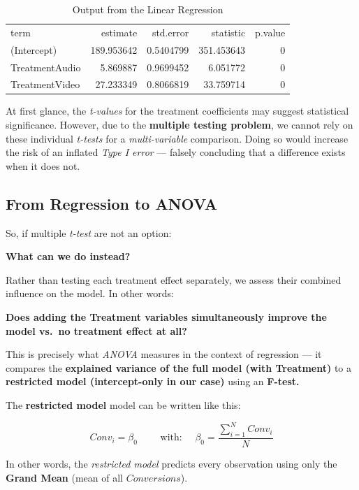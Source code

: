 \documentclass[
  letterpaper,
  DIV=11,
  numbers=noendperiod]{scrartcl}
\begin{document}
\begin{longtable}[t]{lrrrr}

\caption{\label{tbl-LM}Output from the Linear Regression}

\tabularnewline

\\
\toprule
term & estimate & std.error & statistic & p.value\\
\midrule
(Intercept) & 189.953642 & 0.5404799 & 351.453643 & 0\\
TreatmentAudio & 5.869887 & 0.9699452 & 6.051772 & 0\\
TreatmentVideo & 27.233349 & 0.8066819 & 33.759714 & 0\\
\bottomrule

\end{longtable}

At first glance, the \emph{t-values} for the treatment coefficients may
suggest statistical significance. However, due to the \textbf{multiple
testing problem}, we cannot rely on these individual \emph{t-tests} for
a \emph{multi-variable} comparison. Doing so would increase the risk of
an inflated \emph{Type I error} --- falsely concluding that a difference
exists when it does not.

\subsection{From Regression to ANOVA}\label{from-regression-to-anova}

So, if multiple \emph{t-test} are not an option:

\textbf{What can we do instead?}

Rather than testing each treatment effect separately, we assess their
combined influence on the model. In other words:

\textbf{Does adding the Treatment variables simultaneously improve the
model vs.~no treatment effect at all?}

This is precisely what \emph{ANOVA} measures in the context of
regression --- it compares the \textbf{explained variance of the full
model (with Treatment)} to a \textbf{restricted model (intercept-only in
our case)} using an \textbf{F-test.}

The \textbf{restricted model} model can be written like this:

\[
Conv_i=\beta_0 \qquad \mbox{ with: } \quad\beta_0=\frac{\sum_{i=1}^N Conv_i}{N}
\]

In other words, the \emph{restricted model} predicts every observation
using only the \textbf{Grand Mean} (mean of all \(Conversions\)).
\end{document}
